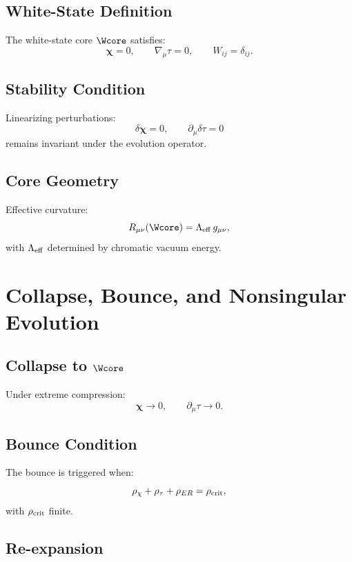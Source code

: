\section{White-State Definition}

The white-state core $\Wcore$ satisfies:
\[
\bm{\chi}=0,\qquad 
\nabla_\mu \tau =0,\qquad 
W_{ij}=\delta_{ij}.
\]

\section{Stability Condition}

Linearizing perturbations:
\[
\delta \bm{\chi}=0,\qquad 
\partial_\mu \delta\tau =0
\]
remains invariant under the evolution operator.

\section{Core Geometry}

Effective curvature:
\[
R_{\mu\nu}(\Wcore)
=
\Lambda_{\rm eff}\, g_{\mu\nu},
\]
with $\Lambda_{\rm eff}$ determined by chromatic vacuum energy.


\chapter{Collapse, Bounce, and Nonsingular Evolution}

\section{Collapse to $\Wcore$}

Under extreme compression:
\[
\bm{\chi}\to 0,
\qquad
\partial_\mu\tau \to 0.
\]

\section{Bounce Condition}

The bounce is triggered when:
\[
\rho_{\chi} + \rho_\tau + \rho_{ER}
=
\rho_{\rm crit},
\]
with $\rho_{\rm crit}$ finite.

\section{Re-expansion}


